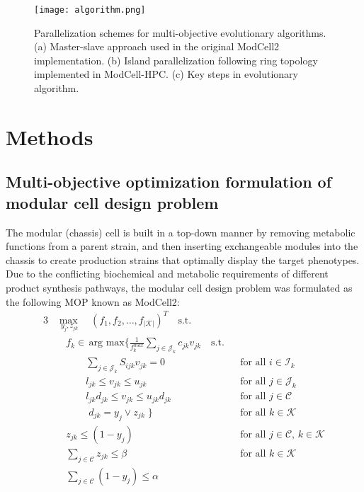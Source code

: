 \begin{figure}[h]
    \centering
    \texttt{[image: algorithm.png]}
    \caption[Parallelization schemes for multi-objective evolutionary algorithms.]{Parallelization schemes for multi-objective evolutionary algorithms. (a) Master-slave approach used in the original ModCell2 implementation. (b) Island parallelization following ring topology implemented in ModCell-HPC. (c) Key steps in evolutionary algorithm.}
    \label{fig7:algorithm}
\end{figure}

\section{Methods}

\subsection{Multi-objective optimization formulation of modular cell design problem} \label{sec:formulation}

The modular (chassis) cell is built in a top-down manner by removing metabolic functions from a parent strain, and then inserting exchangeable modules into the chassis to create production strains that optimally display the target phenotypes.
Due to the conflicting biochemical and metabolic requirements of different product synthesis pathways, the modular cell design problem was formulated as the following MOP known as ModCell2:\citep{garcia2019}
\begingroup
\allowdisplaybreaks
\begin{alignat}{3}
    & \underset{ \; y_j, z_{jk}}{\max} \quad (f_1, f_2, \ldots, f_{|\mathcal{K}|})^T \quad \text{s.t.}  \label{eq7:of1} \\
    &  \quad f_k \in \, \text{arg }\underset{}{\text{max}} \Bigg\{ \frac{1}{f_k^{max}}\sum_{j \in \mathcal{J}_k} c_{jk}  v_{jk} \quad \text{s.t.} \label{eq7:of2}\\
    & \quad \qquad \sum_{j\in \mathcal{J}_k}S_{ijk}v_{jk} = 0 && \text{for all } i \in \mathcal{I}_k  \label{eq7:mb}\\
    & \quad \qquad  l_{jk} \le v_{jk} \le u_{jk}  && \text{for all } j \in \mathcal{J}_k \label{eq7:rb}\\
    & \quad \qquad  l_{jk} d_{jk} \le v_{jk} \le u_{jk} d_{jk} && \text{for all } j \in \mathcal{C} \label{eq7:db}\\
    & \quad \qquad \; d_{jk} = y_j \lor z_{jk} \; \Bigg\} && \text{for all } k \in \mathcal{K} \label{eq7:defdjk} \\
    & \quad z_{jk}\le (1-y_j) && \text{for all } j \in \mathcal{C}, \, k \in \mathcal{K} \label{eq7:mr1}\\
    & \quad \sum_{j \in \mathcal{C}}z_{jk} \le \beta && \text{for all } k \in \mathcal{K} \label{eq7:mr2} \\
    & \quad \sum_{j \in \mathcal{C}} (1-y_j) \le \alpha \label{eq7:a}
\end{alignat}
\endgroup

